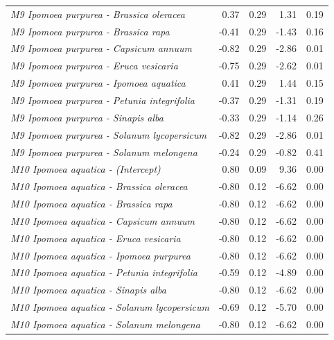 \documentclass[12pt,]{article}
\begin{document}
\begin{longtable}[t]{>{\em}lrrrr}
\addlinespace
M9 Ipomoea purpurea - Brassica oleracea & 0.37 & 0.29 & 1.31 & 0.19\\
\addlinespace
\rowcolor{gray!6}  M9 Ipomoea purpurea - Brassica rapa & -0.41 & 0.29 & -1.43 & 0.16\\
\addlinespace
M9 Ipomoea purpurea - Capsicum annuum & -0.82 & 0.29 & -2.86 & 0.01\\
\addlinespace
\rowcolor{gray!6}  M9 Ipomoea purpurea - Eruca vesicaria & -0.75 & 0.29 & -2.62 & 0.01\\
\addlinespace
M9 Ipomoea purpurea - Ipomoea aquatica & 0.41 & 0.29 & 1.44 & 0.15\\
\addlinespace
\rowcolor{gray!6}  M9 Ipomoea purpurea - Petunia integrifolia & -0.37 & 0.29 & -1.31 & 0.19\\
\addlinespace
M9 Ipomoea purpurea - Sinapis alba & -0.33 & 0.29 & -1.14 & 0.26\\
\addlinespace
\rowcolor{gray!6}  M9 Ipomoea purpurea - Solanum lycopersicum & -0.82 & 0.29 & -2.86 & 0.01\\
\addlinespace
M9 Ipomoea purpurea - Solanum melongena & -0.24 & 0.29 & -0.82 & 0.41\\
\addlinespace
\rowcolor{gray!6}  M10 Ipomoea aquatica - (Intercept) & 0.80 & 0.09 & 9.36 & 0.00\\
\addlinespace
M10 Ipomoea aquatica - Brassica oleracea & -0.80 & 0.12 & -6.62 & 0.00\\
\addlinespace
\rowcolor{gray!6}  M10 Ipomoea aquatica - Brassica rapa & -0.80 & 0.12 & -6.62 & 0.00\\
\addlinespace
M10 Ipomoea aquatica - Capsicum annuum & -0.80 & 0.12 & -6.62 & 0.00\\
\addlinespace
\rowcolor{gray!6}  M10 Ipomoea aquatica - Eruca vesicaria & -0.80 & 0.12 & -6.62 & 0.00\\
\addlinespace
M10 Ipomoea aquatica - Ipomoea purpurea & -0.80 & 0.12 & -6.62 & 0.00\\
\addlinespace
\rowcolor{gray!6}  M10 Ipomoea aquatica - Petunia integrifolia & -0.59 & 0.12 & -4.89 & 0.00\\
\addlinespace
M10 Ipomoea aquatica - Sinapis alba & -0.80 & 0.12 & -6.62 & 0.00\\
\addlinespace
\rowcolor{gray!6}  M10 Ipomoea aquatica - Solanum lycopersicum & -0.69 & 0.12 & -5.70 & 0.00\\
\addlinespace
M10 Ipomoea aquatica - Solanum melongena & -0.80 & 0.12 & -6.62 & 0.00\\
\bottomrule
\end{longtable}
\end{document}
